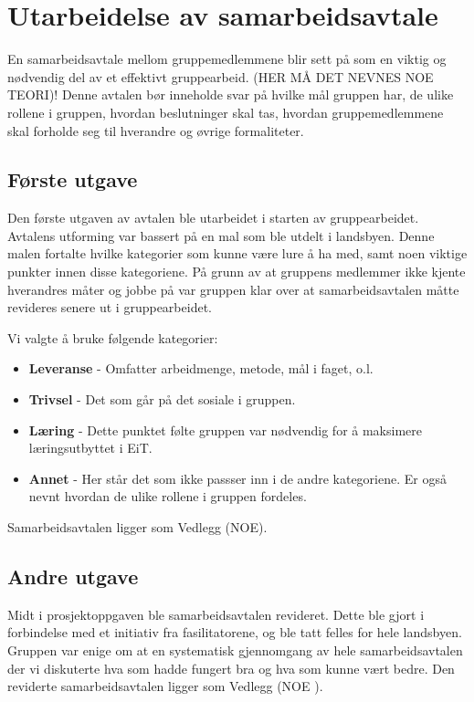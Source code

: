 \section{Utarbeidelse av samarbeidsavtale}
En samarbeidsavtale mellom gruppemedlemmene blir sett på som en viktig og nødvendig del av et effektivt gruppearbeid. 
(HER MÅ DET NEVNES NOE TEORI)!
Denne avtalen bør inneholde svar på hvilke mål gruppen har, de ulike rollene i gruppen, hvordan beslutninger skal tas, hvordan gruppemedlemmene skal forholde seg til hverandre og øvrige formaliteter. 

\subsection{Første utgave}
Den første utgaven av avtalen ble utarbeidet i starten av gruppearbeidet. 
Avtalens utforming var bassert på en mal som ble utdelt i landsbyen. 
Denne malen fortalte hvilke kategorier som kunne være lure å ha med, samt noen viktige punkter innen disse kategoriene. 
På grunn av at gruppens medlemmer ikke kjente hverandres måter og jobbe på var gruppen klar over at samarbeidsavtalen måtte revideres senere ut i gruppearbeidet. 
\vspace{\secspace}

Vi valgte å bruke følgende kategorier:
\begin{itemize}
    \item \textbf{Leveranse} - Omfatter arbeidmenge, metode, mål i faget, o.l.
    \item \textbf{Trivsel} - Det som går på det sosiale i gruppen. 
    \item \textbf{Læring} - Dette punktet følte gruppen var nødvendig for å maksimere læringsutbyttet i EiT. 
    \item \textbf{Annet} - Her står det som ikke passser inn i de andre kategoriene. Er også nevnt hvordan de ulike rollene i gruppen fordeles. 
\end{itemize}
Samarbeidsavtalen ligger som Vedlegg (NOE). 

\subsection{Andre utgave}
Midt i prosjektoppgaven ble samarbeidsavtalen revideret. 
Dette ble gjort i forbindelse med et initiativ fra fasilitatorene, og ble tatt felles for hele landsbyen. 
Gruppen var enige om at en systematisk gjennomgang av hele samarbeidsavtalen der vi diskuterte hva som hadde fungert bra og hva som kunne vært bedre. 
\vspace{\secspace}
Den reviderte samarbeidsavtalen ligger som Vedlegg (NOE ). 